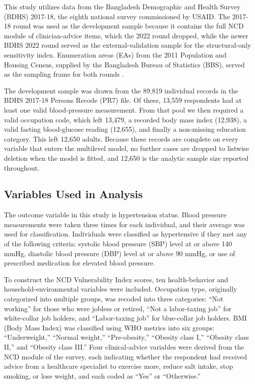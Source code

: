 \documentclass[
  12pt,
  a4paper]{article}
\begin{document}
This study utilizes data from the Bangladesh Demographic and Health Survey (BDHS) 2017-18, the eighth national survey commissioned by USAID. The 2017-18 round was used as the development sample because it contains the full NCD module of clinician-advice items, which the 2022 round dropped, while the newer BDHS 2022 round served as the external-validation sample for the structural-only sensitivity index. Enumeration areas (EAs) from the 2011 Population and Housing Census, supplied by the Bangladesh Bureau of Statistics (BBS), served as the sampling frame for both rounds \citep{bdhs2018misc}.

The development sample was drawn from the 89,819 individual records in the BDHS 2017-18 Persons Recode (PR7) file. Of these, 13,559 respondents had at least one valid blood-pressure measurement. From that pool we then required a valid occupation code, which left 13,479, a recorded body mass index (12,938), a valid fasting blood-glucose reading (12,655), and finally a non-missing education category. This left 12,650 adults. Because these records are complete on every variable that enters the multilevel model, no further cases are dropped to listwise deletion when the model is fitted, and 12,650 is the analytic sample size reported throughout.

\subsection{Variables Used in Analysis}\label{variables-used-in-analysis}

The outcome variable in this study is hypertension status. Blood pressure measurements were taken three times for each individual, and their average was used for classification. Individuals were classified as hypertensive if they met any of the following criteria: systolic blood pressure (SBP) level at or above 140 mmHg, diastolic blood pressure (DBP) level at or above 90 mmHg, or use of prescribed medication for elevated blood pressure.

To construct the NCD Vulnerability Index scores, ten health-behavior and household-environmental variables were included. Occupation type, originally categorized into multiple groups, was recoded into three categories: ``Not working'' for those who were jobless or retired, ``Not a labor-taxing job'' for white-collar job holders, and ``Labor-taxing job'' for blue-collar job holders. BMI (Body Mass Index) was classified using WHO metrics into six groups: ``Underweight,'' ``Normal weight,'' ``Pre-obesity,'' ``Obesity class I,'' ``Obesity class II,'' and ``Obesity class III.'' Four clinical-advice variables were derived from the NCD module of the survey, each indicating whether the respondent had received advice from a healthcare specialist to exercise more, reduce salt intake, stop smoking, or lose weight, and each coded as ``Yes'' or ``Otherwise.''
\end{document}
